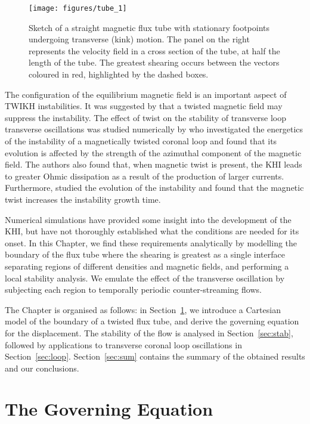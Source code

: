 \documentclass[12pt]{ociamthesis}
\begin{document}
\begin{figure*}[t]
\centering
\texttt{[image: figures/tube\_1]}
\caption{Sketch of a straight magnetic flux tube with stationary footpoints undergoing transverse (kink) motion. The panel on the right represents the velocity field in a cross section of the tube, at half the length of the tube. The greatest shearing occurs between the vectors coloured in red, highlighted by the dashed boxes.}
\label{fig:tube1}
\end{figure*}

The configuration of the equilibrium magnetic field is an important aspect of TWIKH instabilities.
It was suggested by \cite{Terradas2008} that a twisted magnetic field may suppress the instability.
The effect of twist on the stability of transverse loop transverse oscillations was studied numerically by \cite{Howson2017b} who investigated the energetics of the instability of a magnetically twisted coronal loop and found that its evolution is affected by the strength of the azimuthal component of the magnetic field.
The authors also found that, when magnetic twist is present, the KHI leads to greater Ohmic dissipation as a result of the production of larger currents.
Furthermore, \cite{Terradas2018} studied the evolution of the instability and found that the  magnetic twist increases the instability growth time.

Numerical simulations have provided some insight into the development of the KHI, but have not thoroughly established what the conditions are needed for its onset.
In this Chapter, we find these requirements analytically by modelling the boundary of the flux tube where the shearing is greatest as a single interface separating regions of different densities and magnetic fields, and performing a local stability analysis.
We emulate the effect of the transverse oscillation by subjecting each region to temporally periodic counter-streaming flows.

The Chapter is organised as follows: in Section~\ref{sec:goveq}, we introduce a Cartesian model of the boundary of a twisted flux tube, and derive the governing equation for the displacement.
The stability of the flow is analysed in Section~\ref{sec:stab}, followed by applications to transverse coronal loop oscillations in Section~\ref{sec:loop}.
Section~\ref{sec:sum} contains the summary of the obtained results and our conclusions.

\section{The Governing Equation}
\label{sec:goveq}
\end{document}
